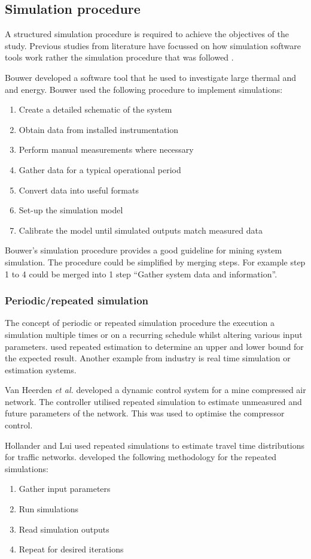 	\subsection{Simulation procedure}
	A structured simulation procedure is required to achieve the objectives of the study.  Previous studies from literature have focussed on how simulation software tools work rather the simulation procedure that was followed \cite{Mare2016PhD}.
	\par
	Bouwer \cite{bouwer2004designing} developed a software tool that he used to investigate large thermal and and energy. Bouwer used the following procedure to implement simulations:
	\begin{enumerate}
		\item Create a detailed schematic of the system
		\item Obtain data from installed instrumentation
		\item Perform manual measurements where necessary
		\item Gather data for a typical operational period
		\item Convert data into useful formats
		\item Set-up the simulation model
		\item Calibrate the model until simulated outputs match measured data
	\end{enumerate}
	Bouwer's simulation procedure provides a good guideline for mining system simulation. The procedure could be simplified by merging steps. For example step 1 to 4 could be merged into 1 step \enquote{Gather system data and information}.
	\subsubsection{Periodic/repeated simulation}
	The concept of periodic or repeated simulation procedure the execution a simulation multiple times or on a recurring schedule whilst altering various input parameters. \cite{Snyman2011Masters} used repeated estimation to determine an upper and lower bound for the expected result. Another example from industry is real time simulation or estimation systems.
	\par 
	 Van Heerden \textit{et al.} \cite{van2014developing} developed a dynamic control system for a mine compressed air network. The controller utilised repeated simulation to estimate unmeasured and future parameters of the network. This was used to optimise the compressor control.
	 \par
	Hollander and Lui \cite{Hollander2008Estimation} used repeated simulations to estimate travel time distributions for traffic networks. \cite{Hollander2008Estimation} developed the following methodology for the repeated simulations:
	\begin{enumerate}
		\item Gather input parameters
		\item Run simulations
		\item Read simulation outputs
		\item Repeat for desired iterations
	\end{enumerate}
